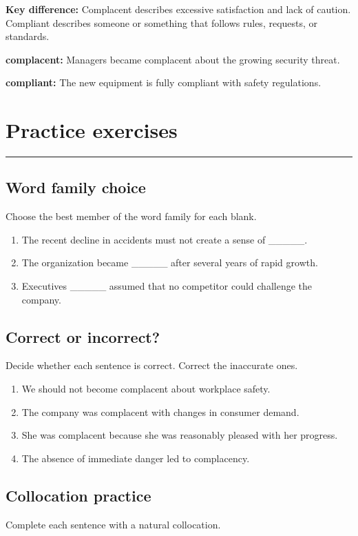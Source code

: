 \documentclass[11pt]{article}
\newcommand{\sectionrule}{\par\vspace{-0.5em}\noindent\textcolor{Accent}{\rule{\linewidth}{0.6pt}}\par}
\begin{document}
\textbf{Key difference:} Complacent describes excessive satisfaction and lack of caution. Compliant describes someone or something that follows rules, requests, or standards.

\textbf{complacent:} Managers became complacent about the growing security threat.

\textbf{compliant:} The new equipment is fully compliant with safety regulations.

\section{Practice exercises}
\sectionrule
\subsection{Word family choice}
Choose the best member of the word family for each blank.

\begin{enumerate}
  \item The recent decline in accidents must not create a sense of \_\_\_\_\_.
  \item The organization became \_\_\_\_\_ after several years of rapid growth.
  \item Executives \_\_\_\_\_ assumed that no competitor could challenge the company.
\end{enumerate}

\subsection{Correct or incorrect?}
Decide whether each sentence is correct. Correct the inaccurate ones.

\begin{enumerate}
  \item We should not become complacent about workplace safety.
  \item The company was complacent with changes in consumer demand.
  \item She was complacent because she was reasonably pleased with her progress.
  \item The absence of immediate danger led to complacency.
\end{enumerate}

\subsection{Collocation practice}
Complete each sentence with a natural collocation.
\end{document}
